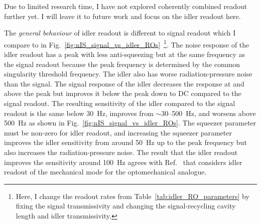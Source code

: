 Due to limited research time, I have not explored coherently combined readout further yet. I will leave it to future work and focus on the idler readout here. 

\label{sec:nIS_general_behaviour_idler}

The \emph{general behaviour} of idler readout is different to signal readout which I compare to in Fig.~\ref{fig:nIS_signal_vs_idler_ROs}~\footnote{Here, I change the readout rates from Table~\ref{tab:idler_RO_parameters} by fixing the signal transmissivity and changing the signal-recycling cavity length and idler transmissivity.}. The noise response of the idler readout has a peak with less anti-squeezing but at the same frequency as the signal readout because the peak frequency is determined by the common singularity threshold frequency. The idler also has worse radiation-pressure noise than the signal.
The signal response of the idler decreases the response at and above the peak but improves it below the peak down to DC compared to the signal readout. 
The resulting sensitivity of the idler compared to the signal readout is the same below 30~Hz, improves from $\sim$30--500~Hz, and worsens above 500~Hz as shown in Fig.~\ref{fig:nIS_signal_vs_idler_ROs}. The squeezer parameter must be non-zero for idler readout, and increasing the squeezer parameter improves the idler sensitivity from around 50~Hz up to the peak frequency but also increases the radiation-pressure noise. 
The result that the idler readout improves the sensitivity around 100~Hz agrees with Ref.~\cite{liEnhancingInterferometerSensitivity2021} that considers idler readout of the mechanical mode for the optomechanical analogue.


